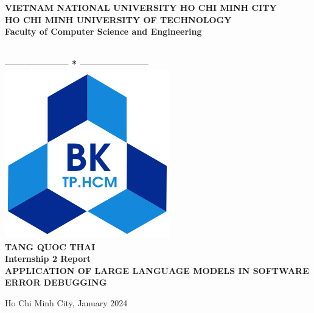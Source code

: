 \documentclass[a4paper,oneside]{book}
\begin{document}
\begin{titlepage}
\thispagestyle{empty}
\usetikzlibrary{calc}

\begin{center}
	\begin{large}
        {\fontsize{12pt}{1}\textbf{VIETNAM NATIONAL UNIVERSITY HO CHI MINH CITY}} \\
		\textbf{HO CHI MINH UNIVERSITY OF TECHNOLOGY} \\
		\textbf{Faculty of Computer Science and Engineering}
	\end{large} \\
	\textbf{--------------------  *  ---------------------}\\

	\vspace{0.8cm}
	\includegraphics[scale=.35]{img/hcmut.png}\\
	\vspace{0.8cm}
    {\fontsize{14.4pt}{1}\selectfont \textbf{TANG QUOC THAI}}\\[.75cm]
	\vspace{0.8cm}
	{\fontsize{14.4pt}{1}\selectfont \textbf{Internship 2 Report}}\\[.75cm]
	{\fontsize{17pt}{1}\selectfont \textbf{\MakeUppercase{APPLICATION OF LARGE LANGUAGE MODELS IN SOFTWARE ERROR DEBUGGING}}}
\end{center}
\vspace{4cm}

\hspace{.5cm}
\begin{center}
    {\fontsize{15pt}{1} Ho Chi Minh City, January 2024}
\end{center}
\end{titlepage}
\newpage
\end{document}
